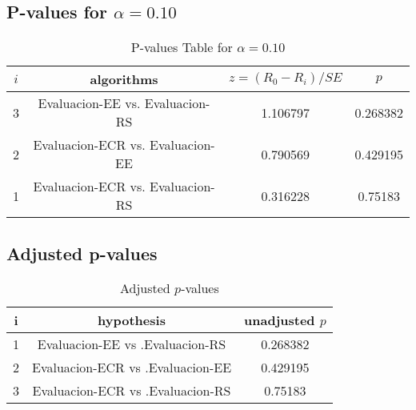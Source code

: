 \documentclass[a4paper,10pt]{article}
\begin{document}
\begin{landscape}
\subsection{P-values for $\alpha=0.10$}

\begin{table}[!htp]
\centering\scriptsize
\begin{tabular}{cccc}
$i$&algorithms&$z=(R_0 - R_i)/SE$&$p$\\
\hline3&Evaluacion-EE vs. Evaluacion-RS&1.106797&0.268382\\
2&Evaluacion-ECR vs. Evaluacion-EE&0.790569&0.429195\\
1&Evaluacion-ECR vs. Evaluacion-RS&0.316228&0.75183\\
\hline
\end{tabular}
\caption{P-values Table for $\alpha=0.10$}
\end{table}\pagebreak

\subsection{Adjusted p-values}

\begin{table}[!htp]
\centering\scriptsize
\begin{tabular}{ccc}
i&hypothesis&unadjusted $p$\\
\hline1&Evaluacion-EE vs .Evaluacion-RS&0.268382\\
2&Evaluacion-ECR vs .Evaluacion-EE&0.429195\\
3&Evaluacion-ECR vs .Evaluacion-RS&0.75183\\
\hline
\end{tabular}
\caption{Adjusted $p$-values}
\end{table}

\end{landscape}
\end{document}
